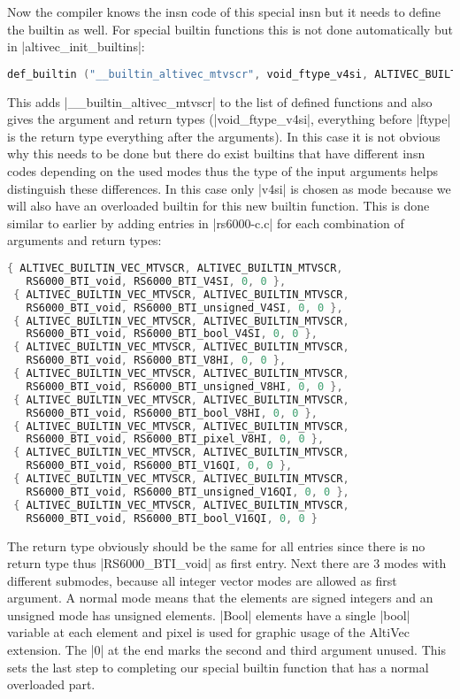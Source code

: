 Now the compiler knows the insn code of this special insn but it needs to define the builtin as well. For special builtin functions this is not done automatically but in |altivec_init_builtins|:
\begin{lstlisting}[language=C++,basicstyle=\ttfamily\scriptsize,keywordstyle=\color{red}] 
def_builtin ("__builtin_altivec_mtvscr", void_ftype_v4si, ALTIVEC_BUILTIN_MTVSCR);
\end{lstlisting}
This adds |__builtin_altivec_mtvscr| to the list of defined functions and also gives the argument and return types (|void_ftype_v4si|, everything before |ftype| is the return type everything after the arguments). In this case it is not obvious why this needs to be done but there do exist builtins that have different insn codes depending on the used modes thus the type of the input arguments helps distinguish these differences. In this case only |v4si| is chosen as mode because we will also have an overloaded builtin for this new builtin function.
This is done similar to earlier by adding entries in |rs6000-c.c| for each combination of arguments and return types:
\begin{lstlisting}[language=C++,basicstyle=\ttfamily\scriptsize,keywordstyle=\color{red}] 
 { ALTIVEC_BUILTIN_VEC_MTVSCR, ALTIVEC_BUILTIN_MTVSCR,
   RS6000_BTI_void, RS6000_BTI_V4SI, 0, 0 },
 { ALTIVEC_BUILTIN_VEC_MTVSCR, ALTIVEC_BUILTIN_MTVSCR,
   RS6000_BTI_void, RS6000_BTI_unsigned_V4SI, 0, 0 },
 { ALTIVEC_BUILTIN_VEC_MTVSCR, ALTIVEC_BUILTIN_MTVSCR,
   RS6000_BTI_void, RS6000_BTI_bool_V4SI, 0, 0 },
 { ALTIVEC_BUILTIN_VEC_MTVSCR, ALTIVEC_BUILTIN_MTVSCR,
   RS6000_BTI_void, RS6000_BTI_V8HI, 0, 0 },
 { ALTIVEC_BUILTIN_VEC_MTVSCR, ALTIVEC_BUILTIN_MTVSCR,
   RS6000_BTI_void, RS6000_BTI_unsigned_V8HI, 0, 0 },
 { ALTIVEC_BUILTIN_VEC_MTVSCR, ALTIVEC_BUILTIN_MTVSCR,
   RS6000_BTI_void, RS6000_BTI_bool_V8HI, 0, 0 },
 { ALTIVEC_BUILTIN_VEC_MTVSCR, ALTIVEC_BUILTIN_MTVSCR,
   RS6000_BTI_void, RS6000_BTI_pixel_V8HI, 0, 0 },
 { ALTIVEC_BUILTIN_VEC_MTVSCR, ALTIVEC_BUILTIN_MTVSCR,
   RS6000_BTI_void, RS6000_BTI_V16QI, 0, 0 },
 { ALTIVEC_BUILTIN_VEC_MTVSCR, ALTIVEC_BUILTIN_MTVSCR,
   RS6000_BTI_void, RS6000_BTI_unsigned_V16QI, 0, 0 },
 { ALTIVEC_BUILTIN_VEC_MTVSCR, ALTIVEC_BUILTIN_MTVSCR,
   RS6000_BTI_void, RS6000_BTI_bool_V16QI, 0, 0 }
\end{lstlisting}
The return type obviously should be the same for all entries since there is no return type thus |RS6000_BTI_void| as first entry. Next there are 3 modes with different submodes, because all integer vector modes are allowed as first argument. A normal mode means that the elements are signed integers and an unsigned mode has unsigned elements. |Bool| elements have a single |bool| variable at each element and pixel is used for graphic usage of the AltiVec extension. The |0| at the end marks the second and third argument unused.
This sets the last step to completing our special builtin function that has a normal overloaded part.

